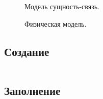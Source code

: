 \documentclass{article}
\title{\vspace{-10ex}}
\author{Артем Оганджанян\vspace{-10ex}}
\date{}
\begin{document}
\maketitle
\vspace{-5ex}

\begin{figure}[ht]
    \centering
    
    \caption{Модель сущность-связь.}
\end{figure}

\begin{figure}[ht]
    \centering
    
    \caption{Физическая модель.}
\end{figure}

\subsection{\texorpdfstring{Создание}{Creation}}
\inputminted{sql}{/home/artem/workspace/study/university/7_term/db/hw2/report/create.sql}

\subsection{\texorpdfstring{Заполнение}{Inflation}}
\inputminted{sql}{/home/artem/workspace/study/university/7_term/db/hw2/report/inflate.sql}
\end{document}
